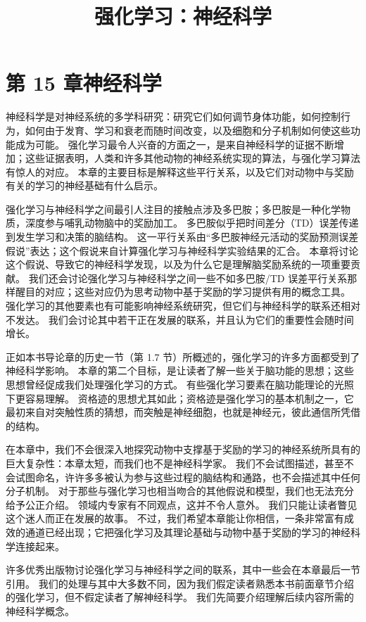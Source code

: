 \documentclass[UTF8,12pt,a4paper,fontset=fandol]{ctexart}
\title{强化学习：神经科学}
\author{}
\date{}
\begin{document}
\maketitle

\section*{第 15 章\quad 神经科学}

神经科学是对神经系统的多学科研究：研究它们如何调节身体功能，如何控制行为，如何由于发育、学习和衰老而随时间改变，以及细胞和分子机制如何使这些功能成为可能。
强化学习最令人兴奋的方面之一，是来自神经科学的证据不断增加；这些证据表明，人类和许多其他动物的神经系统实现的算法，与强化学习算法有惊人的对应。
本章的主要目标是解释这些平行关系，以及它们对动物中与奖励有关的学习的神经基础有什么启示。

强化学习与神经科学之间最引人注目的接触点涉及多巴胺；多巴胺是一种化学物质，深度参与哺乳动物脑中的奖励加工。
多巴胺似乎把时间差分（TD）误差传递到发生学习和决策的脑结构。
这一平行关系由“多巴胺神经元活动的奖励预测误差假说”表达；这个假说来自计算强化学习与神经科学实验结果的汇合。
本章将讨论这个假说、导致它的神经科学发现，以及为什么它是理解脑奖励系统的一项重要贡献。
我们还会讨论强化学习与神经科学之间一些不如多巴胺/TD 误差平行关系那样醒目的对应；这些对应仍为思考动物中基于奖励的学习提供有用的概念工具。
强化学习的其他要素也有可能影响神经系统研究，但它们与神经科学的联系还相对不发达。
我们会讨论其中若干正在发展的联系，并且认为它们的重要性会随时间增长。

正如本书导论章的历史一节（第 1.7 节）所概述的，强化学习的许多方面都受到了神经科学影响。
本章的第二个目标，是让读者了解一些关于脑功能的思想；这些思想曾经促成我们处理强化学习的方式。
有些强化学习要素在脑功能理论的光照下更容易理解。
资格迹的思想尤其如此；资格迹是强化学习的基本机制之一，它最初来自对突触性质的猜想，而突触是神经细胞，也就是神经元，彼此通信所凭借的结构。

在本章中，我们不会很深入地探究动物中支撑基于奖励的学习的神经系统所具有的巨大复杂性：本章太短，而我们也不是神经科学家。
我们不会试图描述，甚至不会试图命名，许许多多被认为参与这些过程的脑结构和通路，也不会描述其中任何分子机制。
对于那些与强化学习也相当吻合的其他假说和模型，我们也无法充分给予公正介绍。
领域内专家有不同观点，这并不令人意外。
我们只能让读者瞥见这个迷人而正在发展的故事。
不过，我们希望本章能让你相信，一条非常富有成效的通道已经出现；它把强化学习及其理论基础与动物中基于奖励的学习的神经科学连接起来。

许多优秀出版物讨论强化学习与神经科学之间的联系，其中一些会在本章最后一节引用。
我们的处理与其中大多数不同，因为我们假定读者熟悉本书前面章节介绍的强化学习，但不假定读者了解神经科学。
我们先简要介绍理解后续内容所需的神经科学概念。
\end{document}
